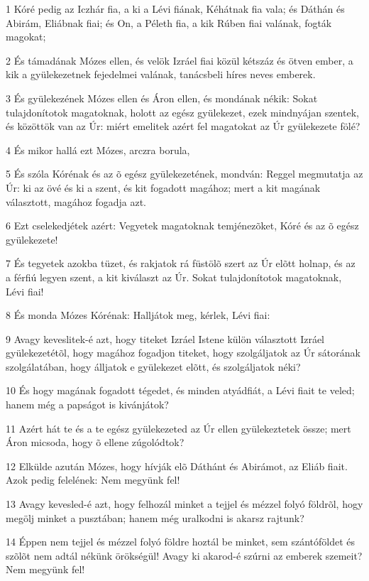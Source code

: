 \par 1 Kóré pedig az Iczhár fia, a ki a Lévi fiának, Kéhátnak fia vala; és Dáthán és Abirám, Eliábnak fiai; és On, a Péleth fia, a kik Rúben fiai valának, fogták magokat;
\par 2 És támadának Mózes ellen, és velök Izráel fiai közül kétszáz és ötven ember, a kik a gyülekezetnek fejedelmei valának, tanácsbeli híres neves emberek.
\par 3 És gyülekezének Mózes ellen és Áron ellen, és mondának nékik: Sokat tulajdonítotok magatoknak, holott az egész gyülekezet, ezek mindnyájan szentek, és közöttök van az Úr: miért emelitek azért fel magatokat az Úr gyülekezete fölé?
\par 4 És mikor hallá ezt Mózes, arczra borula,
\par 5 És szóla Kórénak és az õ egész gyülekezetének, mondván: Reggel megmutatja az Úr: ki az övé és ki a szent, és kit fogadott magához; mert a kit magának választott, magához fogadja azt.
\par 6 Ezt cselekedjétek azért: Vegyetek magatoknak temjénezõket, Kóré és az õ egész gyülekezete!
\par 7 És tegyetek azokba tüzet, és rakjatok rá füstölõ szert az Úr elõtt holnap, és az a férfiú legyen szent, a kit kiválaszt az Úr. Sokat tulajdonítotok magatoknak, Lévi fiai!
\par 8 És monda Mózes Kórénak: Halljátok meg, kérlek, Lévi fiai:
\par 9 Avagy keveslitek-é azt, hogy titeket Izráel Istene külön választott Izráel gyülekezetétõl, hogy magához fogadjon titeket, hogy szolgáljatok az Úr sátorának szolgálatában, hogy álljatok e gyülekezet elõtt, és szolgáljatok néki?
\par 10 És hogy magának fogadott tégedet, és minden atyádfiát, a Lévi fiait te veled; hanem még a papságot is kivánjátok?
\par 11 Azért hát te és a te egész gyülekezeted az Úr ellen gyülekeztetek össze; mert Áron micsoda, hogy õ ellene zúgolódtok?
\par 12 Elkülde azután Mózes, hogy hívják elõ Dáthánt és Abirámot, az Eliáb fiait. Azok pedig felelének: Nem megyünk fel!
\par 13 Avagy kevesled-é azt, hogy felhozál minket a tejjel és mézzel folyó földrõl, hogy megölj minket a pusztában; hanem még uralkodni is akarsz rajtunk?
\par 14 Éppen nem tejjel és mézzel folyó földre hoztál be minket, sem szántóföldet és szõlõt nem adtál nékünk örökségül! Avagy ki akarod-é szúrni az emberek szemeit? Nem megyünk fel!
